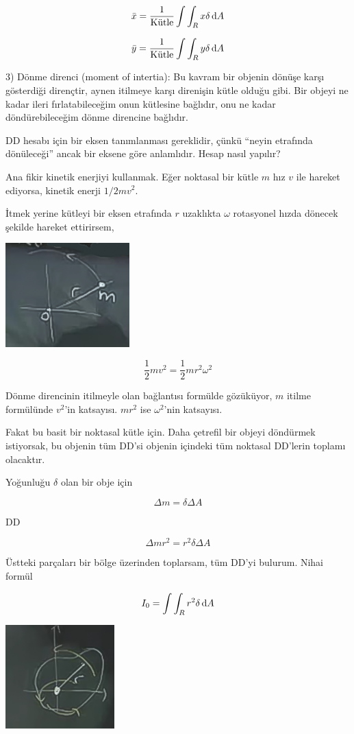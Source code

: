 \documentclass[12pt,fleqn]{article}\usepackage{../../common}
\begin{document}
$$  \bar{x}  = \frac{1}{\textrm{Kütle}} \int \int_R x \delta \,\mathrm{d} A  $$

$$  \bar{y}  = \frac{1}{\textrm{Kütle}} \int \int_R y \delta \,\mathrm{d} A  $$

3) Dönme direnci (moment of intertia): Bu kavram bir objenin dönüşe
karşı gösterdiği dirençtir, aynen itilmeye karşı direnişin kütle olduğu
gibi. Bir objeyi ne kadar ileri fırlatabileceğim onun kütlesine bağlıdır,
onu ne kadar döndürebileceğim dönme direncine bağlıdır. 

DD hesabı için bir eksen tanımlanması gereklidir, çünkü ``neyin etrafında
dönüleceği'' ancak bir eksene göre anlamlıdır. Hesap nasıl yapılır? 

Ana fikir kinetik enerjiyi kullanmak. Eğer noktasal bir kütle $m$ hız $v$
ile hareket ediyorsa, kinetik enerji $1/2 mv^2$. 

İtmek yerine kütleyi bir eksen etrafında $r$ uzaklıkta $\omega$ rotasyonel
hızda dönecek şekilde hareket ettirirsem,

\includegraphics[height=4cm]{17_4.png}

$$ \frac{1}{2}mv^2 = \frac{1}{2}mr^2\omega^2  $$

Dönme direncinin itilmeyle olan bağlantısı formülde gözüküyor, $m$ itilme
formülünde $v^2$'in katsayısı. $mr^2$ ise $\omega^2$'nin katsayısı.

Fakat bu basit bir noktasal kütle için. Daha çetrefil bir objeyi döndürmek
istiyorsak, bu objenin tüm DD'si objenin içindeki tüm noktasal DD'lerin
toplamı olacaktır. 

Yoğunluğu $\delta$ olan bir obje için 

$$ \Delta m = \delta \Delta A $$

DD

$$ \Delta m r^2 = r^2 \delta \Delta A $$

Üstteki parçaları bir bölge üzerinden toplarsam, tüm DD'yi bulurum. Nihai
formül

$$ I_0 = \int \int_R r^2 \delta \,\mathrm{d} A $$

\includegraphics[height=4cm]{17_5.png}
\end{document}
